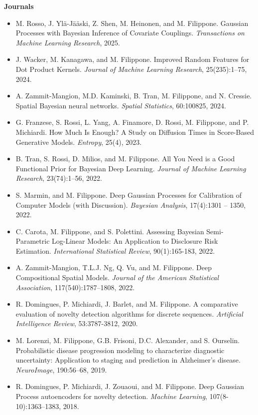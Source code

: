 \textbf{Journals}\begin{itemize}
\item  M. Rosso, J. Yl\"a-J\"a\"aski, Z. Shen, M. Heinonen, and M. Filippone. {Gaussian Processes with Bayesian Inference of Covariate Couplings}. \emph{Transactions on Machine Learning Research}, 2025.
\item  J. Wacker, M. Kanagawa, and M. Filippone. {Improved Random Features for Dot Product Kernels}. \emph{Journal of Machine Learning Research}, 25(235):1--75, 2024.
\item  A. Zammit-Mangion, M.D. Kaminski, B. Tran, M. Filippone, and N. Cressie. Spatial {B}ayesian neural networks. \emph{Spatial Statistics}, 60:100825, 2024.
\item  G. Franzese, S. Rossi, L. Yang, A. Finamore, D. Rossi, M. Filippone, and P. Michiardi. {How Much Is Enough? A Study on Diffusion Times in Score-Based Generative Models}. \emph{Entropy}, 25(4), 2023.
\item  B. Tran, S. Rossi, D. Milios, and M. Filippone. {All You Need is a Good Functional Prior for {B}ayesian Deep Learning}. \emph{Journal of Machine Learning Research}, 23(74):1--56, 2022.
\item  S. Marmin, and M. Filippone. {Deep Gaussian Processes for Calibration of Computer Models (with Discussion)}. \emph{Bayesian Analysis}, 17(4):1301 -- 1350, 2022.
\item  C. Carota, M. Filippone, and S. Polettini. Assessing {B}ayesian Semi-Parametric Log-Linear Models: An Application to Disclosure Risk Estimation. \emph{International Statistical Review}, 90(1):165-183, 2022.
\item  A. Zammit-Mangion, T.L.J. Ng, Q. Vu, and M. Filippone. Deep Compositional Spatial Models. \emph{Journal of the American Statistical Association}, 117(540):1787--1808, 2022.
\item  R. Domingues, P. Michiardi, J. Barlet, and M. Filippone. {A comparative evaluation of novelty detection algorithms for discrete sequences}. \emph{Artificial Intelligence Review}, 53:3787-3812, 2020.
\item  M. Lorenzi, M. Filippone, G.B. Frisoni, D.C. Alexander, and S. Ourselin. Probabilistic disease progression modeling to characterize diagnostic uncertainty: Application to staging and prediction in Alzheimer's disease. \emph{NeuroImage}, 190:56--68, 2019.
\item  R. Domingues, P. Michiardi, J. Zouaoui, and M. Filippone. {Deep Gaussian Process autoencoders for novelty detection}. \emph{Machine Learning}, 107(8-10):1363--1383, 2018.

\end{itemize}
